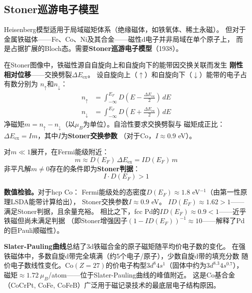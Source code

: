 \documentclass[11pt,a4paper,openany]{book}
\theoremstyle{definition}
\theoremstyle{plain}
\theoremstyle{remark}
\begin{document}
\subsection{Stoner巡游电子模型}

Heisenberg模型适用于局域磁矩体系（绝缘磁体，如铁氧体、稀土永磁）。
但对于金属铁磁体——Fe、Co、Ni及其合金——磁性d电子并非局域在单个原子上，
而是占据扩展的Bloch态。需要\textbf{Stoner巡游电子模型}（1938）。

在Stoner图像中，铁磁性源自自旋向上和自旋向下的能带因交换关联而发生
\textbf{刚性相对位移}——交换劈裂$\Delta E_{\text{ex}}$。
设自旋向上（$\uparrow$）和自旋向下（$\downarrow$）能带的电子占有数分别为
$n_\uparrow$和$n_\downarrow$：
\begin{align}
  n_\uparrow &= \int_{-\infty}^{E_F} D\left(E - \frac{\Delta E_{\text{ex}}}{2}\right)\,dE
  \label{eq:stoner-nup} \\
  n_\downarrow &= \int_{-\infty}^{E_F} D\left(E + \frac{\Delta E_{\text{ex}}}{2}\right)\,dE
  \label{eq:stoner-ndown}
\end{align}
净磁矩$m = n_\uparrow - n_\downarrow$（以$\mu_B$为单位）。自洽性要求交换劈裂与
磁矩成正比：$\Delta E_{\text{ex}} = I m$，其中$I$为\textbf{Stoner交换参数}
（对于Co，$I \approx 0.9$ eV）。

对$m \ll 1$展开，在Fermi能级附近：
\begin{equation}\label{eq:stoner-criterion}
  m \approx D(E_F)\, \Delta E_{\text{ex}} = I D(E_F) \, m
\end{equation}
非平凡解$m \neq 0$存在的条件即为\textbf{Stoner判据}：
\begin{equation}
  \boxed{ I \cdot D(E_F) > 1 }
\end{equation}

\begin{physbox}
\textbf{数值检验。}对于hcp Co：
Fermi能级处的态密度$D(E_F) \approx 1.8$ eV$^{-1}$（由第一性原理LSDA能带计算给出），
Stoner交换参数$I \approx 0.9$ eV。
$I D(E_F) \approx 1.62 > 1$——满足Stoner判据，且余量充裕。
相比之下，fcc Pd的$I D(E_F) \approx 0.9 < 1$——近乎铁磁但尚未满足判据
（即Stoner增强因子$(1 - I D(E_F))^{-1} \approx 10$——解释了Pd的巨Pauli顺磁性）。

\textbf{Slater-Pauling曲线}总结了3d铁磁合金的原子磁矩随平均价电子数的变化。
在强铁磁体中，多数自旋d带完全填满（约5个电子/原子），少数自旋d带的填充分数
随价电子数线性变化。Co$(Z=27)$的价电子构型$3d^8 4s^1$（固体中约为$3d^{8.3} 4s^{0.7}$），
磁矩$\approx 1.72\ \mu_B$/atom——位于Slater-Pauling曲线的峰值附近。
这是Co基合金（CoCrPt, CoFe, CoFeB）广泛用于磁记录技术的最底层电子结构原因。
\end{physbox}
\end{document}
